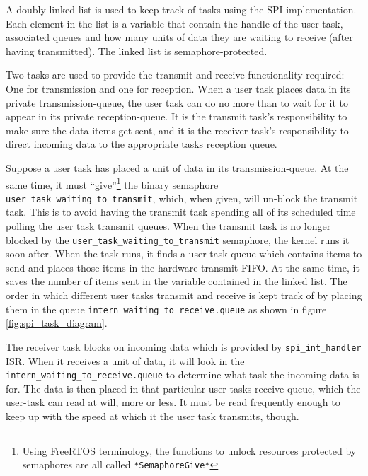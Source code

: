 A doubly linked list is used to keep track of tasks using the SPI implementation. Each element in the list is a variable that contain the handle of the user task, associated queues and how many units of data they are waiting to receive (after having transmitted). The linked list is semaphore-protected.

Two tasks are used to provide the transmit and receive functionality required: One for transmission and one for reception. When a user task places data in its private transmission-queue, the user task can do no more than to wait for it to appear in its private reception-queue. It is the transmit task's responsibility to make sure the data items get sent, and it is the receiver task's responsibility to direct incoming data to the appropriate tasks reception queue.

Suppose a user task has placed a unit of data in its transmission-queue. At the same time, it must ``give''\footnote{Using FreeRTOS terminology, the functions to unlock resources protected by semaphores are all called \texttt{*SemaphoreGive*}} the binary semaphore \texttt{user\_task\_waiting\_to\_transmit}, which, when given, will un-block the transmit task. This is to avoid having the transmit task spending all of its scheduled time polling the user task transmit queues. When the transmit task is no longer blocked by the \texttt{user\_task\_waiting\_to\_transmit} semaphore, the kernel runs it soon after. When the task runs, it finds a user-task queue which contains items to send and places those items in the hardware transmit FIFO. At the same time, it saves the number of items sent in the variable contained in the linked list. The order in which different user tasks transmit and receive is kept track of by placing them in the queue \texttt{intern\_waiting\_to\_receive.queue} as shown in figure \ref{fig:spi_task_diagram}.

The receiver task blocks on incoming data which is provided by \texttt{spi\_int\_handler} ISR. When it receives a unit of data, it will look in the \texttt{intern\_waiting\_to\_receive.queue} to determine what task the incoming data is for. The data is then placed in that particular user-tasks receive-queue, which the user-task can read at will, more or less. It must be read frequently enough to keep up with the speed at which it the user task transmits, though.

